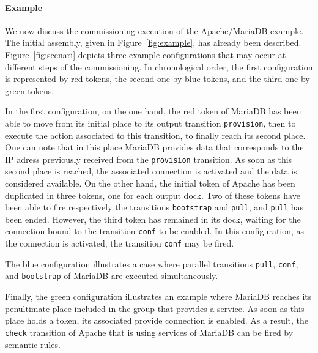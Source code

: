 \paragraph{Example}{
We now discuss the commissioning execution of the Apache/MariaDB
example.  The initial assembly, given in Figure~\ref{fig:example}, has
already been described. Figure~\ref{fig:scenari} depicts three example
configurations that may occur at different steps of the
commissioning. In chronological order, the first configuration is
represented by red tokens, the second one by blue tokens, and the
third one by green tokens.

In the first configuration, on the one hand, the red token of MariaDB
has been able to move from its initial place to its output transition
\texttt{provision}, then to execute the action associated to this
transition, to finally reach its second place. One can note that in
this place MariaDB provides data that corresponds to the IP adress
previously received from the \texttt{provision} transition. As soon as this
second place is reached, the associated connection is activated and the
data is considered available. On the other hand, the initial token
of Apache has been duplicated in three tokens, one for each output
dock. Two of these tokens have been able to fire respectively the
transitions \texttt{bootstrap} and \texttt{pull}, and \texttt{pull}
has been ended. However, the third token has remained in its dock,
waiting for the connection bound to the transition \texttt{conf} to be
enabled. In this configuration, as the connection is activated,
the transition \texttt{conf} may be fired.

The blue configuration illustrates a case where parallel transitions
\texttt{pull}, \texttt{conf}, and \texttt{bootstrap} of MariaDB are
executed simultaneously.

Finally, the green configuration illustrates an example where
MariaDB reaches its penultimate place included in the group that
provides a service. As soon as this place holds a token, its
associated provide connection is enabled. As a result, the
\texttt{check} transition of Apache that is using services of MariaDB
can be fired by semantic rules.}
